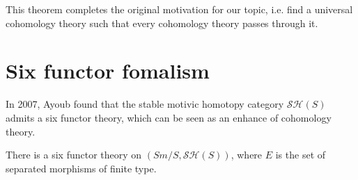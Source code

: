 This theorem completes the original motivation for our topic, i.e. find a universal cohomology theory such that every cohomology theory passes through it.

\section{Six functor fomalism}

In 2007, Ayoub \cite{Ayoub2007} found that the stable motivic homotopy category $\mathcal{SH}(S)$ admits a six functor theory, which can be seen as an enhance of cohomology theory.

\begin{theorem}\cite{Ayoub2007}
    There is a six functor theory on $(Sm/S,\mathcal{SH}(S))$, where $E$ is the set of separated morphisms of finite type.
\end{theorem}

